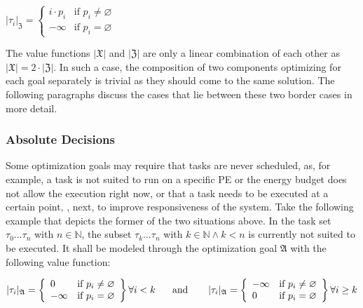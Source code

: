 \begin{center}
	\(|\tau_i|_\mathfrak{Z} = \left\{ \begin{array}{ll}
		i \cdot p_i & \mbox{if } p_i \neq \varnothing \\
		- \infty    & \mbox{if } p_i = \varnothing
	\end{array}\right.\)
\end{center}

The value functions \(|\mathfrak{X}|\) and \(|\mathfrak{Z}|\) are only a linear combination of each other as \(|\mathfrak{X}| = 2 \cdot |\mathfrak{Z}|\). In such a case, the composition of two components optimizing for each goal separately is trivial as they should come to the same solution. The following paragraphs discuss the cases that lie between these two border cases in more detail.

\subsubsection{Absolute Decisions}%
\label{sec:prop:compo:ability:absolute}

Some optimization goals may require that tasks are never scheduled, as, for example, a task is not suited to run on a specific \ac{PE} or the energy budget does not allow the execution right now, or that a task needs to be executed at a certain point, \eg{}, next, to improve responsiveness of the system. Take the following example that depicts the former of the two situations above. In the task set \(\tau_0 \ldots \tau_n\) with \(n \in \mathbb{N}\), the subset \(\tau_k \ldots \tau_n\) with \(k \in \mathbb{N} \wedge k < n\) is currently not suited to be executed. It shall be modeled through the optimization goal \(\mathfrak{A}\) with the following value function:

\begin{center}
	\(|\tau_i|_\mathfrak{A} = \left\{ \begin{array}{ll}
		0        & \mbox{if } p_i \neq \varnothing \\
		- \infty & \mbox{if } p_i = \varnothing
	\end{array}\right\} \forall i < k
	\text{\hspace{0.5cm} and \hspace{0.5cm} }
	|\tau_i|_\mathfrak{A} = \left\{ \begin{array}{ll}
		- \infty & \mbox{if } p_i \neq \varnothing \\
		0        & \mbox{if } p_i = \varnothing
	\end{array}\right\} \forall i \geq k\)
\end{center}

